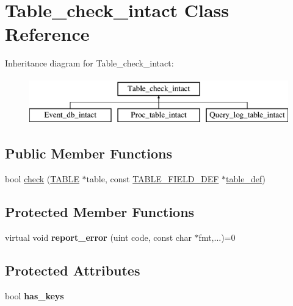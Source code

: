 \hypertarget{classTable__check__intact}{}\section{Table\+\_\+check\+\_\+intact Class Reference}
\label{classTable__check__intact}
Inheritance diagram for Table\+\_\+check\+\_\+intact\+:\begin{figure}[H]
\begin{center}
\leavevmode
\includegraphics[height=2.000000cm]{classTable__check__intact}
\end{center}
\end{figure}
\subsection*{Public Member Functions}
\begin{DoxyCompactItemize}
\item 
bool \mbox{\hyperlink{classTable__check__intact_a6ddfab1ea1b4e7bdfcefe9525d1c4b4c}{check}} (\mbox{\hyperlink{structTABLE}{T\+A\+B\+LE}} $\ast$table, const \mbox{\hyperlink{structst__table__field__def}{T\+A\+B\+L\+E\+\_\+\+F\+I\+E\+L\+D\+\_\+\+D\+EF}} $\ast$\mbox{\hyperlink{classtable__def}{table\+\_\+def}})
\end{DoxyCompactItemize}
\subsection*{Protected Member Functions}
\begin{DoxyCompactItemize}
\item 
\mbox{\label{classTable__check__intact_a80ebe8ce5e22b0eaf9f1e4209aba0dd2}} 
virtual void {\bfseries report\+\_\+error} (uint code, const char $\ast$fmt,...)=0
\end{DoxyCompactItemize}
\subsection*{Protected Attributes}
\begin{DoxyCompactItemize}
\item 
\mbox{\label{classTable__check__intact_a7054fb413f844b41355411d853077bf8}} 
bool {\bfseries has\+\_\+keys}
\end{DoxyCompactItemize}



